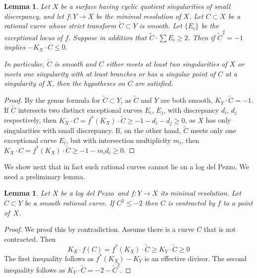\documentclass[11pt]{amsbook}
\theoremstyle{plain}
\newtheorem{lem}[thm]{Lemma}
\newcommand{\ldp}{log del Pezzo}
\newcommand{\minres}{minimal resolution}
\newcommand{\wt}[1]{\widetilde #1}
\begin{document}
\begin{lem}\label{lem!badcurve}
Let $X$ be a surface having cyclic quotient singularities of small discrepancy, and let  $f \colon Y \rightarrow X$ be the minimal resolution of $X$. Let $C \subset X$ be a rational curve whose 
strict transform $\widetilde C \subset Y$ is smooth. Let $\{ E_i \}$ be the exceptional locus of $f$. Suppose in addition that 
$\widetilde C \cdot \sum E_i \geq 2$.
Then if $\widetilde C^2 = -1$ implies $-K_X \cdot C \leq 0$.

In particular, $\widetilde C$ is smooth and
$C$ either meets at least two singularities of $X$ or meets one singularity
with at least branches or has a singular point of $C$ at a singularity of $X$,
then the hypotheses on $C$ are satisfied.
\end{lem}
\begin{proof}
By the genus formula for $\widetilde C\subset Y$, as $\widetilde C$ and $Y$ are both smooth,
$K_Y \cdot \widetilde C = -1$. If $\wt C$ intersects two distinct exceptional curves $E_i$, $E_j$,
with discrepancy $d_i$, $d_j$ respectively, then
 $K_X \cdot C = f^*(K_X) \cdot \widetilde C \geq -1 - d_i - d_j  \geq 0$,
 as $X$ has only singularities with small discrepancy. 
 If, on the other hand, $\wt C$ meets only one exceptional curve $E_i$, but with intersection
multiplicity $m_i$, then $K_X \cdot C = f^*(K_X) \cdot \widetilde C \geq -1 - m_id_i  \geq 0$.
\end{proof}

We show next that in fact such rational curves cannot lie on a \ldp.
We need a preliminary lemma.
\begin{lem}\label{lem!minus2curve}
Let $X$ be a \ldp\ and $f \colon Y \rightarrow X$ its \minres.
Let $C\subset Y$ be a smooth rational curve. If $C^2\le-2$ then $C$ is contracted by $f$
to a point of~$X$.
\end{lem}

\begin{proof}
We proof this by contradiction. Assume there is a curve $C$ that is not contracted. Then 
\[
K_X \cdot f(C) = f^*(K_X) \cdot \wt{C} \geq K_Y \cdot \wt{C} \geq 0
\]
The first inequality follows as $f^*(K_X) - K_Y$ is an effective divisor. The second inequality follows as $K_Y \cdot \wt{C} = -2 - \wt{C}^2$.
\end{proof}
\end{document}

